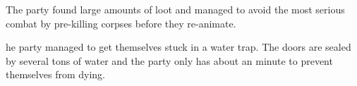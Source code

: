 The party found large amounts of loot and managed to avoid the most serious combat by pre-killing corpses before they re-animate.

he party managed to get themselves stuck in a water trap.
The doors are sealed by several tons of water and the party only has about an minute to prevent themselves from dying.
